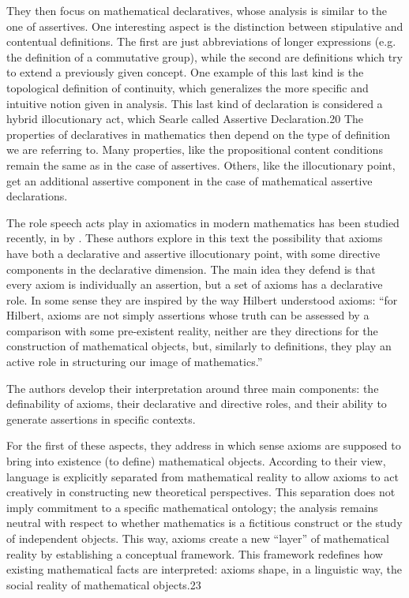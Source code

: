 \documentclass[11pt,a4paper]{article}
\begin{document}
They then focus on mathematical declaratives, whose analysis is similar to the one of assertives. One interesting aspect is the distinction between stipulative and contentual definitions. The first are just abbreviations of longer expressions (e.g. the definition of a commutative group), while the second are definitions which try to extend a previously given concept. One example of this last kind is the topological definition of continuity, which generalizes the more specific and intuitive notion given in analysis. This last kind of declaration is considered a hybrid illocutionary act, which Searle called Assertive Declaration.20 The properties of declaratives in mathematics then depend on the type of definition we are referring to. Many properties, like the propositional content conditions remain the same as in the case of assertives. Others, like the illocutionary point, get an additional assertive component in the case of mathematical assertive declarations.

The role speech acts play in axiomatics in modern mathematics has been studied recently, in by \textcite{SchmidtVenturi2024}. These authors explore in this text the possibility that axioms have both a declarative and assertive illocutionary point, with some directive components in the declarative dimension. The main idea they defend is that every axiom is individually an assertion, but a set of axioms has a declarative role. In some sense they are inspired by the way Hilbert understood axioms: “for Hilbert, axioms are not simply assertions whose truth can be assessed by a comparison with some pre-existent reality, neither are they directions for the construction of mathematical objects, but, similarly to definitions, they play an active role in structuring our image of mathematics.”

The authors develop their interpretation around three main components: the definability of axioms, their declarative and directive roles, and their ability to generate assertions in specific contexts. 

For the first of these aspects, they address in which sense axioms are supposed to bring into existence (to define) mathematical objects. According to their view, language is explicitly separated from mathematical reality to allow axioms to act creatively in constructing new theoretical perspectives. This separation does not imply commitment to a specific mathematical ontology; the analysis remains neutral with respect to whether mathematics is a fictitious construct or the study of independent objects. This way, axioms create a new “layer” of mathematical reality by establishing a conceptual framework. This framework redefines how existing mathematical facts are interpreted: axioms shape, in a linguistic way, the social reality of mathematical objects.23 
\end{document}

